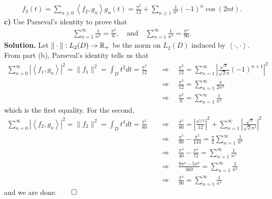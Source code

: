 \documentclass[10pt]{article}
\newcommand{\1}[1]{\mathbbm{1}_{#1}} \newcommand{\mc}[1]{\mathcal{#1}}
\newcommand{\ip}[2]{\left\langle#1,#2\right\rangle }
\begin{document}
    \begin{align*}
        f_2(t)=\sum_{n\geq 0}\ip{f_2}{g_n}g_n(t)=\frac{\pi^{2}}{12}+\sum_{n\geq 1}\frac{1}{n^2}(-1)^n\cos(2nt).\tag*{$\qed$}
    \end{align*}
    {\bf c)} Use Parseval's identity to prove that
    \begin{align*}
        \sum_{n=1}^\infty\frac{1}{n^2}=\frac{\pi^2}{6},\quad\text{and}\quad\sum_{n=1}^\infty\frac{1}{n^4}=\frac{\pi^4}{90}.
    \end{align*}
    {\bf Solution.} Let $\|\cdot\|:L_2(D)\rightarrow\mathbb{R}_+$ be the norm on $L_2(D)$ induced by $\ip{\cdot}{\cdot}$. From part (b), Parseval's identity tells us that
    \begin{align*}
        \sum_{n=0}^\infty|\ip{f_1}{g_n}|^2=\|f_1\|^2=\int_Dt^2dt=\frac{\pi^3}{12}\quad&\Rightarrow\quad \frac{\pi^3}{12}=\sum_{n=1}^\infty\left|\frac{\sqrt{\pi}}{\sqrt{2}n}(-1)^{n+1}\right|^2\\
        &\Rightarrow\quad\frac{\pi^3}{12}=\sum_{n=1}^\infty \frac{\pi}{2n^2}\\
        &\Rightarrow\quad\frac{\pi^2}{6}=\sum_{n=1}^\infty\frac{1}{n^2}
    \end{align*}
    which is the first equality. For the second, 
    \begin{align*}
        \sum_{n=0}^\infty|\ip{f_2}{g_n}|^2=\|f_2\|^2=\int_Dt^4dt=\frac{\pi^5}{80}\quad&\Rightarrow\quad\frac{\pi^5}{80}=\left|\frac{\pi^{5/2}}{12}\right|^2+\sum_{n=1}^\infty\left|\frac{\sqrt{\pi}}{\sqrt{2}n^2}\right|^2\\
        &\Rightarrow\quad\frac{\pi^5}{80}-\frac{\pi^5}{144}=\frac{\pi}{2}\sum_{n=1}^\infty\frac{1}{n^4}\\
        &\Rightarrow\quad\frac{\pi^4}{40}-\frac{\pi^4}{72}=\sum_{n=1}^\infty\frac{1}{n^4}\\
        &\Rightarrow\quad\frac{9\pi^4-5\pi^4}{360}=\sum_{n=1}^\infty\frac{1}{n^4}\\
        &\Rightarrow\quad\frac{\pi^4}{90}=\sum_{n=1}^\infty\frac{1}{n^4}
    \end{align*}
    and we are done.\hfill{$\qed$}\\[5pt]
\end{document}
